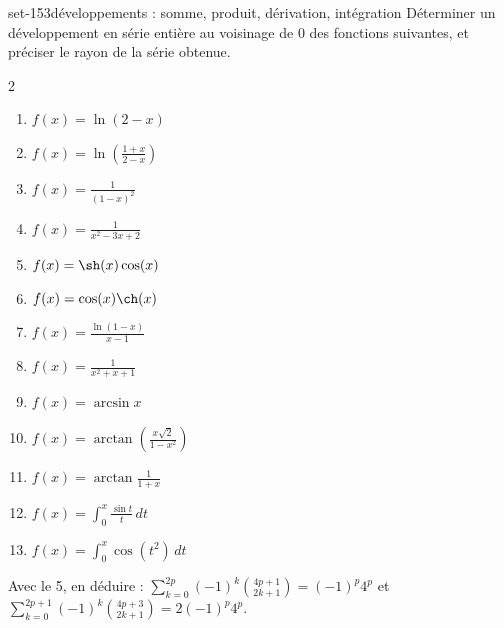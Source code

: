 \begin{exo}{set-15}{3}{développements : somme, produit, dérivation, intégration}
Déterminer un développement en série entière au voisinage de $0$ des fonctions suivantes, et préciser le rayon de la série obtenue.
\begin{multicols}{2}
\begin{enumerate}
\item $f(x)=\ln(2-x)$
\item $f(x)=\ln\left(\frac{1+x}{2-x}\right)$
\item $f(x)=\frac1{(1-x)^2}$
\item $f(x)=\frac1{x^2-3x+2}$
\item $f(x)=\sh(x)\cos(x)$
\item $f(x)=\cos(x)\ch(x)$
\item $f(x)=\frac{\ln(1-x)}{x-1}$
\item $f(x)=\frac1{x^2+x+1}$
\item $f(x)=\arcsin x$
\item $f(x)=\arctan\left(\frac{x\sqrt2}{1-x^2}\right)$
\item $f(x)=\arctan\frac1{1+x}$
\item $f(x)=\int_0^x\frac{\sin t}t\,dt$
\item $f(x)=\int_0^x\cos(t^2)\,dt$
\end{enumerate}
\end{multicols}
Avec le 5, en déduire : $\displaystyle\sum_{k=0}^{2p}(-1)^k\binom{4p+1}{2k+1}=(-1)^p4^p$ et $\displaystyle\sum_{k=0}^{2p+1}(-1)^k\binom{4p+3}{2k+1}=2(-1)^p4^p$.
\end{exo}

